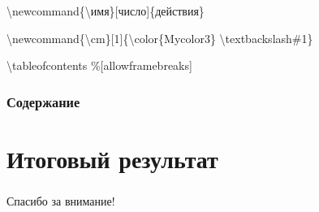 \documentclass[russian, 14pt]{beamer}
\newcommand{\cm}[1]{{\color{Mycolor3}\textbackslash#1}}
\begin{document}
\begin{frame}
	\frametitle{\insertsection}
	\begin{block}{}
		\cm{newcommand}\{\textbackslash имя\}[число]\{действия\}
	\end{block}
	\begin{block}{}
		\cm{newcommand}\{\textbackslash cm\}[1]\{\cm{color}\{Mycolor3\}
		\cm{textbackslash}\#1\}
	\end{block}
\end{frame}

\begin{frame}[allowframebreaks]{}
	\begin{block}{}
		\cm{tableofcontents} \%[allowframebreaks]
	\end{block}
	\frametitle{Содержание}
	\tableofcontents
\end{frame}

\section{Итоговый результат}

\begin{frame}
	\frametitle{\insertsection}
\end{frame}

\begin{frame}
	\centering
	\LARGE{Спасибо за внимание!}
\end{frame}
\end{document}
